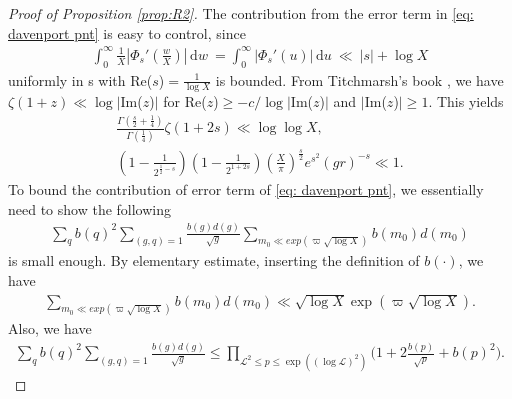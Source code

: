 \documentclass[12pt,reqno]{amsart}
\numberwithin{equation}{section}
\theoremstyle{plain}
\theoremstyle{definition}
\theoremstyle{remark}
\newcommand{\dd}{\mathrm{d}}
\begin{document}
\begin{proof}[Proof of Proposition \ref{prop:R2}]
The contribution from the error term in \eqref{eq:  davenport pnt} is easy to control, since
  \begin{align}\label{eq:  bound on phi ' s}
    \int_0^{\infty } \frac{1}{X}\left| \Phi_s'\left( \frac{w}{X}\right)\right|\,\dd w \ = \int_0^{\infty} |\Phi_s'(u)|\,\dd u \ \ll \ |s|+\log X
    \end{align}
  uniformly in s with Re($s$)$=\frac{1}{\log X}$ is bounded.
From Titchmarsh's book \cite[Theorem 3.5 and (3.11.8)]{Ti86}, we have $\zeta (1+z) \ll \log \vert $Im($z$)$\vert $ for Re($z$)$\geqslant -c/\log \vert$Im($z$)$\vert $ and $\vert$Im($z$)$\vert $$\geqslant 1$. This yields
\begin{equation}\label{eq: bound on other integral terems}
  \begin{split}
  \frac{\Gamma(\frac{s}{2}+\frac{1}{4})}
  {\Gamma(\frac{1}{4})}\zeta(1+2s) \ll \log \log X,
       \\
\left( 1-\frac{1}{2^{\frac{1}{2}-s}}\right)\left(1 - \frac{1}{2^{1+2s}}\right)
\left(\frac{X}{\pi}\right)
^{\frac{s}{2}}e^{s^2} \left( gr\right)^{-s} \ll 1 .
  \end{split}
\end{equation}
To bound the contribution of error term of  \eqref{eq:  davenport pnt}, we essentially need to show the following
\begin{equation*}\label{eq: sum on q,g,m0 ordinary zeros}
  \begin{split}
    \sum_{q}b(q)^2\sum_{(g, q)=1}\frac{b(g)d(g)}{\sqrt{g}}\sum_{m_0 \ll exp(\varpi \sqrt{\log X})}b(m_0)d(m_0)
  \end{split}
\end{equation*}
is small enough.
By elementary estimate, inserting the definition of $b(\cdot)$, we have
\begin{equation}\label{eq:sum on m0 ordinary zeros}
  \begin{split}
    \sum_{m_0 \ll exp(\varpi \sqrt{\log X})}b(m_0)d(m_0) \ll \sqrt{\log X}\exp(\varpi \sqrt{\log X}).
  \end{split}
\end{equation}
Also, we have
\begin{align}\label{eq:sum on q,g ordinary zeros}
  \sum_{q}b(q)^2\sum_{(g, q)=1}\frac{b(g)d(g)}{\sqrt{g}} \leq \prod_{\mathcal{L}^2\leq p \leq \exp((\log \mathcal{L})^2)}\bigg(1+2\frac{b(p)}{\sqrt{p}}+b(p)^2\bigg).
\end{align}


\end{proof}
\end{document}
